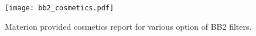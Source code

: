 \begin{figure}
    \centering
    \texttt{[image: bb2\_cosmetics.pdf]}
    \caption{Materion provided cosmetics report for various option of BB2 filters.}
    \label{fig:bb2_cosmetics}
\end{figure}






